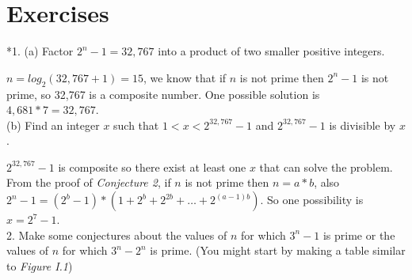 \section{Exercises}

*1. (a) Factor $2^n - 1 = 32,767$ into a product of two smaller positive
integers.

$n = log_2(32,767+1) = 15$, we know that if $n$ is not prime then $2^n - 1$ is not prime, so 32,767 is a composite number. One possible solution is $4,681 * 7 = 32,767$.\\

(b) Find an integer $x$ such that $1 < x < 2^{32,767} - 1$ and $2^{32,767} - 1$ is divisible by $x$.

$2^{32,767} - 1$ is composite so there exist at least one $x$ that can solve the problem. From the proof of \textit{Conjecture 2}, if $n$ is not prime then $n = a*b$, also $2^n - 1 = (2^b - 1) * (1 + 2^b + 2^{2b} + \ldots + 2^{(a-1)b})$. So one possibility is $x = 2^7 - 1$.\\

2. Make some conjectures about the values of $n$ for which $3^n - 1$ is prime or the values of $n$ for which $3^n - 2^n$ is prime. (You might start by making a table similar to \textit{Figure I.1})
